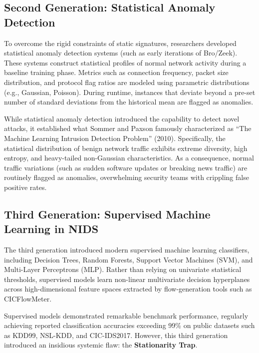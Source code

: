 \documentclass[12pt,a4paper,oneside]{report}
\begin{document}
\subsection{Second Generation: Statistical Anomaly Detection}
To overcome the rigid constraints of static signatures, researchers developed statistical anomaly detection systems (such as early iterations of Bro/Zeek). These systems construct statistical profiles of normal network activity during a baseline training phase. Metrics such as connection frequency, packet size distribution, and protocol flag ratios are modeled using parametric distributions (e.g., Gaussian, Poisson). During runtime, instances that deviate beyond a pre-set number of standard deviations from the historical mean are flagged as anomalies.

While statistical anomaly detection introduced the capability to detect novel attacks, it established what Sommer and Paxson famously characterized as ``The Machine Learning Intrusion Detection Problem'' (2010). Specifically, the statistical distribution of benign network traffic exhibits extreme diversity, high entropy, and heavy-tailed non-Gaussian characteristics. As a consequence, normal traffic variations (such as sudden software updates or breaking news traffic) are routinely flagged as anomalies, overwhelming security teams with crippling false positive rates.

\subsection{Third Generation: Supervised Machine Learning in NIDS}
The third generation introduced modern supervised machine learning classifiers, including Decision Trees, Random Forests, Support Vector Machines (SVM), and Multi-Layer Perceptrons (MLP). Rather than relying on univariate statistical thresholds, supervised models learn non-linear multivariate decision hyperplanes across high-dimensional feature spaces extracted by flow-generation tools such as CICFlowMeter.

Supervised models demonstrated remarkable benchmark performance, regularly achieving reported classification accuracies exceeding 99\% on public datasets such as KDD99, NSL-KDD, and CIC-IDS2017. However, this third generation introduced an insidious systemic flaw: the \textbf{Stationarity Trap}.
\end{document}
